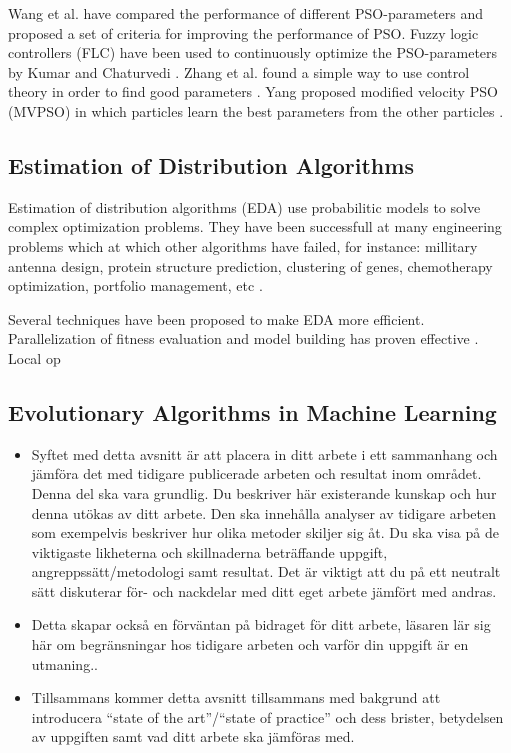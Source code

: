 Wang et al. \cite{dang2012selection} have compared the performance of different PSO-parameters and proposed a set of criteria for improving the performance of PSO. Fuzzy logic controllers (FLC) have been used to continuously optimize the PSO-parameters by Kumar and Chaturvedi \cite{kumar2011tuning}. Zhang et al. found a simple way to use control theory in order to find good parameters \cite{zhang2011simple}. Yang proposed modified velocity PSO (MVPSO) in which particles learn the best parameters from the other particles \cite{yang2011particle}.


\subsection{Estimation of Distribution Algorithms}

Estimation of distribution algorithms (EDA) use probabilitic models to solve complex optimization problems. They have been successfull at many engineering problems which at which other algorithms have failed, for instance: millitary antenna design, protein structure prediction, clustering of genes, chemotherapy optimization, portfolio management, etc \cite{Hauschild2011111}.

Several techniques have been proposed to make EDA more efficient. Parallelization of fitness evaluation and model building has proven effective \cite{sastry2007towards}. Local op


\subsection{Evolutionary Algorithms in Machine Learning}




{\color{blue}
\begin{itemize}
  \item Syftet med detta avsnitt \"ar att placera in ditt arbete i ett sammanhang och j\"amf\"ora det med tidigare publicerade arbeten och resultat inom omr\r{a}det. Denna del ska vara grundlig. Du beskriver h\"ar existerande kunskap och hur denna ut\"okas av ditt arbete. Den ska inneh\r{a}lla analyser av tidigare arbeten som exempelvis beskriver hur olika metoder skiljer sig \r{a}t. Du ska visa p\r{a} de viktigaste likheterna och skillnaderna betr\"affande uppgift, angreppss\"att/metodologi samt resultat. Det \"ar viktigt att du p\r{a} ett neutralt s\"att diskuterar f\"or- och nackdelar med ditt eget arbete j\"amf\"ort med andras.
  \item Detta skapar ocks\r{a} en f\"orv\"antan p\r{a} bidraget f\"or ditt arbete, l\"asaren l\"ar sig h\"ar om begr\"ansningar hos tidigare arbeten och varf\"or din uppgift \"ar en utmaning..
  \item Tillsammans kommer detta avsnitt tillsammans med bakgrund att introducera ``state of the art''/``state of practice'' och dess brister, betydelsen av uppgiften samt vad ditt arbete ska j\"amf\"oras med.
\end{itemize}




}
